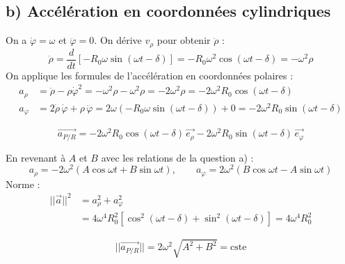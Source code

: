 \documentclass[11pt,a4paper]{article}
\begin{document}
\subsection*{b) Accélération en coordonnées cylindriques}
On a $\dot\varphi=\omega$ et $\ddot\varphi = 0$. On dérive $v_\rho$ pour obtenir $\ddot\rho$ :
$$ \ddot\rho = \frac{d}{dt}\left[-R_0\omega\sin(\omega t-\delta)\right] = -R_0\omega^2\cos(\omega t-\delta) = -\omega^2\rho $$
On applique les formules de l'accélération en coordonnées polaires :
\begin{align*}
a_\rho &= \ddot\rho - \rho\dot\varphi^2 = -\omega^2\rho - \omega^2\rho = -2\omega^2\rho = -2\omega^2R_0\cos(\omega t-\delta) \\
a_\varphi &= 2\dot\rho\,\dot\varphi + \rho\,\ddot\varphi = 2\omega\left(-R_0\omega\sin(\omega t-\delta)\right) + 0 = -2\omega^2R_0\sin(\omega t-\delta)
\end{align*}
\begin{sonucbox}
$$ \vec{a_{P/R}} = -2\omega^2R_0\cos(\omega t-\delta)\,\vec{e_\rho} - 2\omega^2R_0\sin(\omega t-\delta)\,\vec{e_\varphi} $$
\end{sonucbox}
En revenant à $A$ et $B$ avec les relations de la question a) :
$$ a_\rho = -2\omega^2\left(A\cos\omega t+B\sin\omega t\right), \qquad a_\varphi = 2\omega^2\left(B\cos\omega t - A\sin\omega t\right) $$
Norme :
\begin{align*}
||\vec{a}||^2 &= a_\rho^2 + a_\varphi^2 \\
&= 4\omega^4R_0^2\left[\cos^2(\omega t-\delta)+\sin^2(\omega t-\delta)\right] = 4\omega^4R_0^2
\end{align*}
\begin{sonucbox}
$$ ||\vec{a_{P/R}}|| = 2\omega^2\sqrt{A^2+B^2} = \text{cste} $$
\end{sonucbox}
\end{document}
